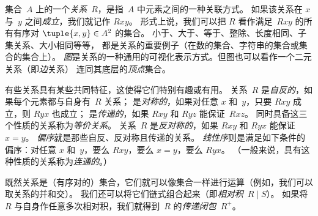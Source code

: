集合~$A$ 上的一个\emph{关系}~$R$，是指~$A$ 中元素之间的一种关联方式。
如果该关系在 $x$ 与~$y$ 之间\emph{成立}，我们就记作 $Rxy$。
形式上说，我们可以把 $R$ 看作满足~$Rxy$ 的所有有序对
$\tuple{x,y} \in A^2$ 的集合。
小于、大于、等于、整除、长度相同、子集关系、大小相同等等，
都是关系的重要例子（在数的集合、字符串的集合或集合的集合上）。
\emph{图}是关系的一种通用的可视化表示方式。但图也可以看作一个二元关系（即\emph{边}关系）
连同其底层的\emph{顶点}集合。

有些关系具有某些共同特征，这使得它们特别有趣或有用。
关系~$R$ 是\emph{自反的}，如果每个元素都与自身有~$R$ 关系；
是\emph{对称的}，如果对任意 $x$ 和~$y$，只要 $Rxy$ 成立，则 $Ryx$ 也成立；
是\emph{传递的}，如果 $Rxy$ 和 $Ryz$ 能保证~$Rxz$。
同时具备这三个性质的关系称为\emph{等价关系}。
关系~$R$ 是\emph{反对称的}，如果 $Rxy$ 和 $Ryx$ 能保证~$x=y$。
\emph{偏序}就是那些自反、反对称且传递的关系。
\emph{线性序}则是满足如下条件的偏序：对任意 $x$ 和~$y$，要么 $Rxy$，要么 $x=y$，要么 $Ryx$。
（一般来说，具有这种性质的关系称为\emph{连通的}。）

既然关系是（有序对的）集合，它们就可以像集合一样进行运算（例如，我们可以取关系的并和交）。
我们还可以将它们链式组合起来（即\emph{相对积}~$R \mid S$）。
如果将~$R$ 与自身作任意多次相对积，我们就得到~$R$ 的\emph{传递闭包}~$R^+$。